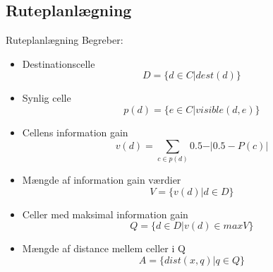 \subsection{Ruteplanlægning}

\begin{frame}{Ruteplanlægning}
Begreber:
\begin{itemize}
\item Destinationscelle
$$D = \{d \in C \vert dest(d) \}$$
\item Synlig celle
$$p(d) = \{e \in C \vert visible(d,e) \}$$
\item Cellens information gain
$$v(d) = \sum_{c \in p(d)}{0.5- \vert 0.5 - P(c) \vert}$$
\end{itemize}

\end{frame}


\begin{frame}

\begin{itemize}
\item Mængde af information gain værdier
$$V = \{v(d) \vert d \in D \}$$
\item Celler med maksimal information gain
$$Q = \{ d \in D \vert v(d) \in maxV \}$$
\item Mængde af distance mellem celler i Q
$$A = \{dist(x,q) \vert q \in Q \}$$
\end{itemize}

\end{frame}
